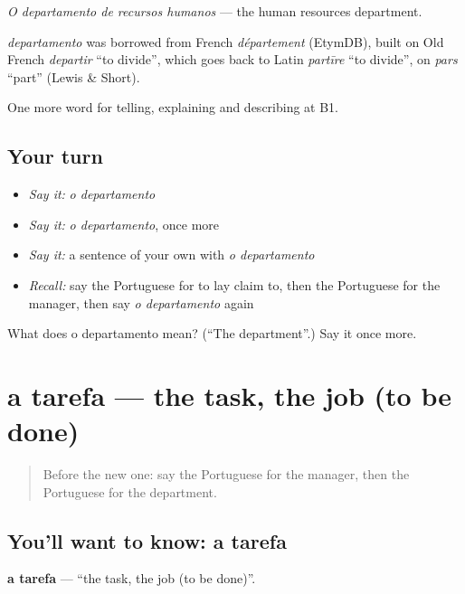 \emph{O departamento de recursos humanos} — the human resources department.

\begin{cousinweb}
\emph{departamento} was borrowed from French \emph{département} (EtymDB), built on Old French \emph{departir} \textquotedblleft{}to divide\textquotedblright{}, which goes back to Latin \emph{partīre} \textquotedblleft{}to divide\textquotedblright{}, on \emph{pars} \textquotedblleft{}part\textquotedblright{} (Lewis \& Short).
\end{cousinweb}

\begin{grammarlens}[title={What you've built}]
One more word for telling, explaining and describing at B1.
\end{grammarlens}

\subsection*{Your turn}
\begin{itemize}
\raggedright
  \item \emph{Say it:} \emph{o departamento}
  \item \emph{Say it:} \emph{o departamento}, once more
  \item \emph{Say it:} a sentence of your own with \emph{o departamento}
  \item \emph{Recall:} say the Portuguese for to lay claim to, then the Portuguese for the manager, then say \emph{o departamento} again
\end{itemize}

\begin{tcolorbox}[breakable,colback=teal!4,colframe=teal!35!black,title={Before you move on}]
What does o departamento mean? (\textquotedblleft{}The department\textquotedblright{}.) Say it once more.
\end{tcolorbox}
\section[a tarefa]{a tarefa — the task, the job (to be done)}

\label{lesson:PT-C359-tarefa}



\begin{quote}
Before the new one: say the Portuguese for the manager, then the Portuguese for the department.
\end{quote}

\subsection*{You'll want to know: a tarefa}
\textbf{a tarefa} — \textquotedblleft{}the task, the job (to be done)\textquotedblright{}.

